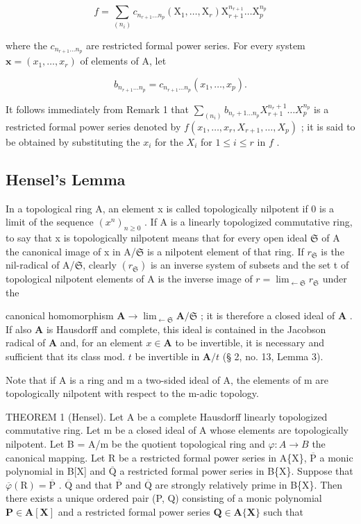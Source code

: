 \[
f = \sum_ {(n _ {i})} c _ {n _ {r + 1} \dots n _ {p}} (\mathrm{X} _ {1}, \dots , \mathrm{X} _ {r}) \mathrm{X} _ {r + 1} ^ {n _ {r + 1}} \dots \mathrm{X} _ {p} ^ {n _ {p}}
\]

where the \(c_{n_{r+1}\ldots n_p}\) are restricted formal power series. For every system \(\mathbf{x} = (x_1, \ldots, x_r)\) of elements of A, let

\[
b _ {n _ {r + 1} \dots n _ {p}} = c _ {n _ {r + 1} \dots n _ {p}} (x _ {1}, \dots , x _ {p}).
\]

It follows immediately from Remark 1 that \(\sum_{(n_i)} b_{n_r+1 \ldots n_p} X_{r+1}^{n_r+1} \ldots X_p^{n_p}\) is a restricted formal power series denoted by \(f(x_1, \ldots, x_r, X_{r+1}, \ldots, X_p)\) ; it is said to be obtained by substituting the \(x_i\) for the \(X_i\) for \(1 \leqslant i \leqslant r\) in \(f\) .

\subsection{Hensel's Lemma}

In a topological ring A, an element x is called topologically nilpotent if 0 is a limit of the sequence \((x^{n})_{n\geqslant0}\) . If A is a linearly topologized commutative ring, to say that x is topologically nilpotent means that for every open ideal \(\mathfrak{S}\) of A the canonical image of x in A/\(\mathfrak{S}\) is a nilpotent element of that ring. If \(r_{\mathfrak{S}}\) is the nil-radical of A/\(\mathfrak{S}\), clearly \((r_{\mathfrak{S}})\) is an inverse system of subsets and the set t of topological nilpotent elements of A is the inverse image of \(r=\lim_{\leftarrow \mathfrak{S}}r_{\mathfrak{S}}\) under the

canonical homomorphism \(\mathbf{A} \to \lim_{\leftarrow \mathfrak{S}} \mathbf{A} / \mathfrak{S}\) ; it is therefore a closed ideal of \(\mathbf{A}\) . If also \(\mathbf{A}\) is Hausdorff and complete, this ideal is contained in the Jacobson radical of \(\mathbf{A}\) and, for an element \(x \in \mathbf{A}\) to be invertible, it is necessary and sufficient that its class mod. \(t\) be invertible in \(\mathbf{A} / t\) (§ 2, no. 13, Lemma 3).

Note that if A is a ring and m a two-sided ideal of A, the elements of m are topologically nilpotent with respect to the m-adic topology.

THEOREM 1 (Hensel). Let A be a complete Hausdorff linearly topologized commutative ring. Let m be a closed ideal of A whose elements are topologically nilpotent. Let B = A/m be the quotient topological ring and \(\varphi: A \to B\) the canonical mapping. Let R be a restricted formal power series in A\{X\}, \(\overline{\mathrm{P}}\) a monic polynomial in B{[}X{]} and \(\overline{\mathrm{Q}}\) a restricted formal power series in B\{X\}. Suppose that \(\overline{\varphi}(\mathrm{R}) = \overline{\mathrm{P}}\) . \(\overline{\mathrm{Q}}\) and that \(\overline{\mathrm{P}}\) and \(\overline{\mathrm{Q}}\) are strongly relatively prime in B\{X\}. Then there exists a unique ordered pair (P, Q) consisting of a monic polynomial \(\mathbf{P} \in \mathbf{A}[\mathbf{X}]\) and a restricted formal power series \(\mathbf{Q} \in \mathbf{A}\{\mathbf{X}\}\) such that

